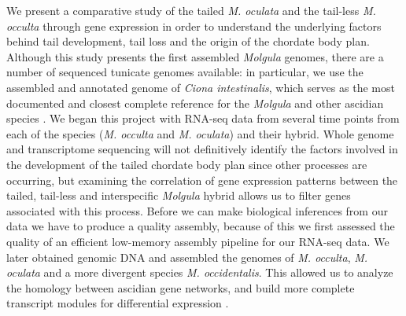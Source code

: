 We present a comparative study of the tailed \textit{M. oculata} and the tail-less \textit{M. occulta} through gene expression in order to understand the underlying factors behind tail development, tail loss and the origin of the chordate body plan. Although this study presents the first assembled \textit{Molgula} genomes, there are a number of sequenced tunicate genomes available: in particular, we use the assembled and annotated genome of \textit{Ciona intestinalis}, which serves as the most documented and closest complete reference for the \textit{Molgula} and other ascidian species \cite{dehal_draft_2002,satoh_ascidian_2003,satoh_ciona_2003}. We began this project with RNA-seq data from several time points from each of the species (\textit{M. occulta} and \textit{M. oculata}) and their hybrid. 
Whole genome and transcriptome sequencing will not definitively identify the factors involved in the development of the tailed chordate body plan since other processes are occurring, but examining the correlation of gene expression patterns between the tailed, tail-less and interspecific \textit{Molgula} hybrid allows us to filter genes associated with this process. Before we can make biological inferences from our data we have to produce a quality assembly, because of this we first assessed the quality of an efficient low-memory assembly pipeline for our RNA-seq data.
We later obtained genomic DNA and assembled the genomes of \textit{M. occulta}, \textit{M. oculata} and a more divergent species \textit{M. occidentalis}. This allowed us to analyze the homology between ascidian gene networks, and build more complete transcript modules for differential expression \cite{vijay_challenges_2012}.

